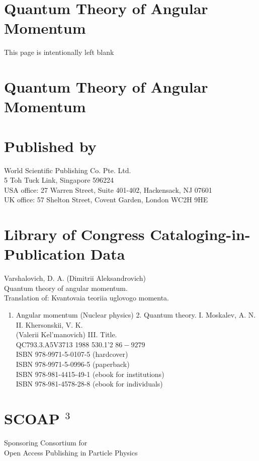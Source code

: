\section*{Quantum Theory of Angular Momentum }
This page is intentionally left blank

\section*{Quantum Theory of Angular Momentum }


\section*{Published by}
World Scientific Publishing Co. Pte. Ltd.\\
5 Toh Tuck Link, Singapore 596224\\
USA office: 27 Warren Street, Suite 401-402, Hackensack, NJ 07601\\
UK office: 57 Shelton Street, Covent Garden, London WC2H 9HE

\section*{Library of Congress Cataloging-in-Publication Data}
Varshalovich, D. A. (Dimitrii Aleksandrovich)\\
Quantum theory of angular momentum.\\
Translation of: Kvantovaia teoriia uglovogo momenta.

\begin{enumerate}
  \item Angular momentum (Nuclear physics) 2. Quantum theory. I. Moskalev, A. N. II. Khersonskii, V. K.\\
(Valerii Kel'manovich) III. Title.\\
QC793.3.A5V3713 1988 530.1'2 $86-9279$\\
ISBN 978-9971-5-0107-5 (hardcover)\\
ISBN 978-9971-5-0996-5 (paperback)\\
ISBN 978-981-4415-49-1 (ebook for institutions)\\
ISBN 978-981-4578-28-8 (ebook for individuals)
\end{enumerate}

\section*{SCOAP ${ }^{3}$ }
Sponsoring Consortium for\\
Open Access Publishing in Particle Physics

